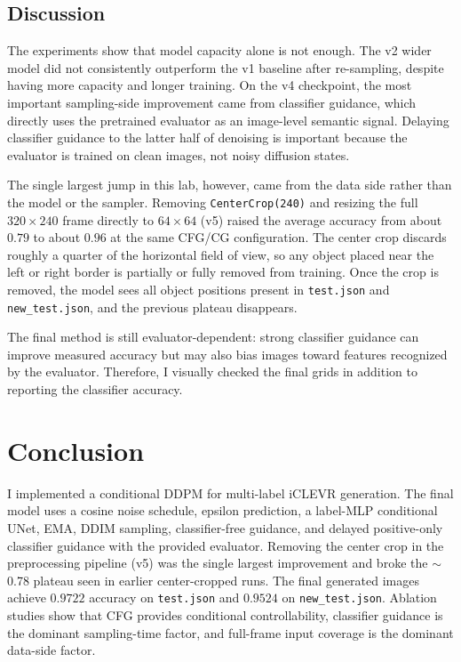 \documentclass[10pt,twocolumn,letterpaper]{article}
\begin{document}
\subsection{Discussion}

The experiments show that model capacity alone is not enough. The v2 wider model did not consistently outperform the v1 baseline after re-sampling, despite having more capacity and longer training. On the v4 checkpoint, the most important sampling-side improvement came from classifier guidance, which directly uses the pretrained evaluator as an image-level semantic signal. Delaying classifier guidance to the latter half of denoising is important because the evaluator is trained on clean images, not noisy diffusion states.

The single largest jump in this lab, however, came from the data side rather than the model or the sampler. Removing \texttt{CenterCrop(240)} and resizing the full $320\times240$ frame directly to $64\times64$ (v5) raised the average accuracy from about $0.79$ to about $0.96$ at the same CFG/CG configuration. The center crop discards roughly a quarter of the horizontal field of view, so any object placed near the left or right border is partially or fully removed from training. Once the crop is removed, the model sees all object positions present in \texttt{test.json} and \texttt{new\_test.json}, and the previous plateau disappears.

The final method is still evaluator-dependent: strong classifier guidance can improve measured accuracy but may also bias images toward features recognized by the evaluator. Therefore, I visually checked the final grids in addition to reporting the classifier accuracy.

\section{Conclusion}

I implemented a conditional DDPM for multi-label iCLEVR generation. The final model uses a cosine noise schedule, epsilon prediction, a label-MLP conditional UNet, EMA, DDIM sampling, classifier-free guidance, and delayed positive-only classifier guidance with the provided evaluator. Removing the center crop in the preprocessing pipeline (v5) was the single largest improvement and broke the $\sim$0.78 plateau seen in earlier center-cropped runs. The final generated images achieve $0.9722$ accuracy on \texttt{test.json} and $0.9524$ on \texttt{new\_test.json}. Ablation studies show that CFG provides conditional controllability, classifier guidance is the dominant sampling-time factor, and full-frame input coverage is the dominant data-side factor.
\end{document}
